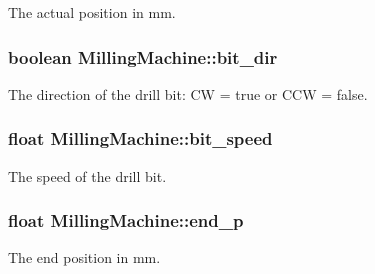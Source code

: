 The actual position in mm. 

\hypertarget{class_milling_machine_a5ce9e8b53197142881889d113424f3be}{
\subsubsection[{bit\+\_\+dir}]{\setlength{\rightskip}{0pt plus 5cm}boolean Milling\+Machine\+::bit\+\_\+dir\hspace{0.3cm}{\ttfamily [private]}}}\label{class_milling_machine_a5ce9e8b53197142881889d113424f3be}


The direction of the drill bit\+: C\+W = true or C\+C\+W = false. 

\hypertarget{class_milling_machine_ab82a92b8eeab7eb5e820314a7ac01dd8}{
\subsubsection[{bit\+\_\+speed}]{\setlength{\rightskip}{0pt plus 5cm}float Milling\+Machine\+::bit\+\_\+speed\hspace{0.3cm}{\ttfamily [private]}}}\label{class_milling_machine_ab82a92b8eeab7eb5e820314a7ac01dd8}


The speed of the drill bit. 

\hypertarget{class_milling_machine_a20735dbad8367b9e46380de13d1c0ae3}{
\subsubsection[{end\+\_\+p}]{\setlength{\rightskip}{0pt plus 5cm}float Milling\+Machine\+::end\+\_\+p\hspace{0.3cm}{\ttfamily [private]}}}\label{class_milling_machine_a20735dbad8367b9e46380de13d1c0ae3}


The end position in mm. 


